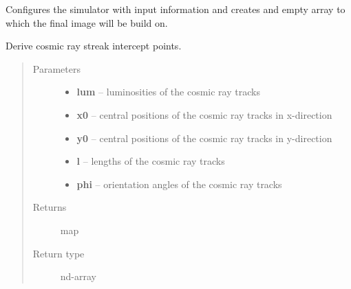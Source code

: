 \documentclass[a4paper,11pt,english]{sphinxmanual}
\begin{document}
\begin{fulllineitems}
\begin{fulllineitems}
\end{fulllineitems}


\begin{fulllineitems}
\label{simulator:simulator.simulator.VISsimulator.configure}
Configures the simulator with input information and creates and empty array to which the final image will
be build on.

\end{fulllineitems}


\begin{fulllineitems}
\label{simulator:simulator.simulator.VISsimulator.cosmicRayIntercepts}
Derive cosmic ray streak intercept points.
\begin{quote}\begin{description}
\item[{Parameters}] \leavevmode\begin{itemize}
\item {} 
\textbf{lum} -- luminosities of the cosmic ray tracks

\item {} 
\textbf{x0} -- central positions of the cosmic ray tracks in x-direction

\item {} 
\textbf{y0} -- central positions of the cosmic ray tracks in y-direction

\item {} 
\textbf{l} -- lengths of the cosmic ray tracks

\item {} 
\textbf{phi} -- orientation angles of the cosmic ray tracks

\end{itemize}

\item[{Returns}] \leavevmode
map

\item[{Return type}] \leavevmode
nd-array

\end{description}\end{quote}

\end{fulllineitems}


\end{fulllineitems}
\end{document}
